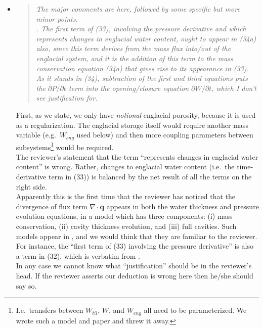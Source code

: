 \documentclass[11pt,reqno]{amsart}
\newcommand{\Div}{\ensuremath{\nabla\cdot}}
\newcommand{\reply}[2]{
\medskip\medskip
\item  \begin{quote}
\emph{#1}
\end{quote}

\medskip
\noindent #2}
\begin{document}
\begin{itemize}
\reply{The major comments are here, followed by some specific but more minor points.\\
\indent 1. The first term of (33), involving the pressure derivative and which represents
changes in englacial water content, ought to appear in (34a) also, since this term
derives from the mass flux into/out of the englacial system, and it is the addition
of this term to the mass conservation equation (34a) that gives rise to its appearance in (33).  As it stands in (34), subtraction of the first and third equations
puts the $\partial P/\partial t$ term into the opening/closure equation $\partial W/\partial t$, which I don't see justification for.}
{First, as we state, we only have \emph{notional} englacial porosity, because it is used as a regularization.  The englacial storage itself would require another mass variable (e.g.~$W_{eng}$ used below) and then more coupling parameters between subsystems\footnote{I.e.~transfers between $W_{til}$, $W$, and $W_{eng}$ all need to be parameterized.  We wrote such a model and paper and threw it away.} would be required. \\
\indent The reviewer's statement that the term ``represents changes in englacial water content'' is wrong.  Rather, changes to englacial water content (i.e.~the time-derivative term in (33)) is balanced by the net result of all the terms on the right side.\\
\indent Apparently this is the first time that the reviewer has noticed that the divergence of flux term $\Div\mathbf{q}$ appears in both the water thickness and pressure evolution equations, in a model which has three components: (i) mass conservation, (ii) cavity thickness evolution, and (iii) full cavities.  Such models appear in \cite{Hewitt2011,Hewittetal2012,Schoofetal2012,Werderetal2013}, and we would think that they are familiar to the reviewer.  For instance, the ``first term of (33) involving the pressure derivative'' is also a term in (32), which is verbatim from \cite{Schoofetal2012}.\\
\indent In any case we cannot know what ``justification'' should be in the reviewer's head.  If the reviewer asserts our deduction is wrong here then he/she should say so.}


\end{itemize}
\end{document}

